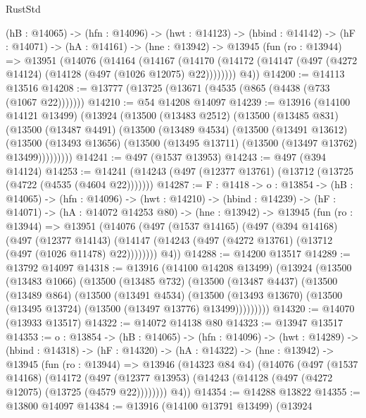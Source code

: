 \begin{lexlean}{RustStd}
\begin{coremodule}
  (hB : @14065) ->
  (hfn : @14096) ->
  (hwt : @14123) ->
  (hbind : @14142) ->
  (hF : @14071) ->
  (hA : @14161) ->
  (hne : @13942) ->
  @13945
    (fun (ro : @13944) =>
    @13951
      (@14076
        (@14164
          (@14167
            (@14170 (@14172 (@14147 (@497 (@4272 @14124) (@14128 (@497 (@1026 @12075) @22))))))))
        @4))
@14200 := @14113 @13516
@14208 := @13777 (@13725 (@13671 (@4535 (@865 (@4438 (@733 (@1067 @22)))))))
@14210 := @54 @14208 @14097
@14239 := @13916
    (@14100 @14121 @13499)
    (@13924
      (@13500
        (@13483 @2512)
        (@13500
          (@13485 @831)
          (@13500
            (@13487 @4491)
            (@13500
              (@13489 @4534)
              (@13500
                (@13491 @13612)
                (@13500
                  (@13493 @13656)
                  (@13500 (@13495 @13711) (@13500 (@13497 @13762) @13499)))))))))
@14241 := @497 (@1537 @13953)
@14243 := @497 (@394 @14124)
@14253 := @14241 (@14243 (@497 (@12377 @13761) (@13712 (@13725 (@4722 (@4535 (@4604 @22)))))))
@14287 := {F : @1418} ->
  {o : @13854} ->
  (hB : @14065) ->
  (hfn : @14096) ->
  (hwt : @14210) ->
  (hbind : @14239) ->
  (hF : @14071) ->
  (hA : @14072 @14253 @80) ->
  (hne : @13942) ->
  @13945
    (fun (ro : @13944) =>
    @13951
      (@14076
        (@497
          (@1537 @14165)
          (@497
            (@394 @14168)
            (@497
              (@12377 @14143)
              (@14147 (@14243 (@497 (@4272 @13761) (@13712 (@497 (@1026 @11478) @22))))))))
        @4))
@14288 := @14200 @13517
@14289 := @13792 @14097
@14318 := @13916
    (@14100 @14208 @13499)
    (@13924
      (@13500
        (@13483 @1066)
        (@13500
          (@13485 @732)
          (@13500
            (@13487 @4437)
            (@13500
              (@13489 @864)
              (@13500
                (@13491 @4534)
                (@13500
                  (@13493 @13670)
                  (@13500 (@13495 @13724) (@13500 (@13497 @13776) @13499)))))))))
@14320 := @14070 (@13933 @13517)
@14322 := @14072 @14138 @80
@14323 := @13947 @13517
@14353 := {o : @13854} ->
  (hB : @14065) ->
  (hfn : @14096) ->
  (hwt : @14289) ->
  (hbind : @14318) ->
  (hF : @14320) ->
  (hA : @14322) ->
  (hne : @13942) ->
  @13945
    (fun (ro : @13944) =>
    @13946
      (@14323 @84 @4)
      (@14076
        (@497
          (@1537 @14168)
          (@14172
            (@497 (@12377 @13953) (@14243 (@14128 (@497 (@4272 @12075) (@13725 (@4579 @22))))))))
        @4))
@14354 := @14288 @13822
@14355 := @13800 @14097
@14384 := @13916
    (@14100 @13791 @13499)
    (@13924

\end{coremodule}
\end{lexlean}
